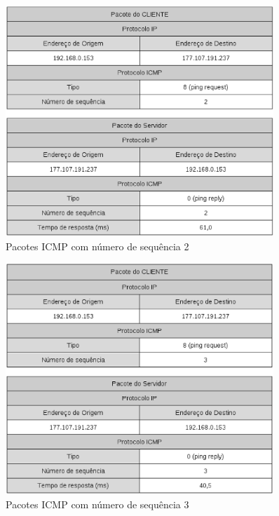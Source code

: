    \begin{figure}[h]
      \centering
      \includegraphics[width=0.9\textwidth]{figuras/pkg_icmp_seq_2.eps}
      \caption{Pacotes ICMP com número de sequência 2}
      \label{fig:pkg_icmp_seq_2}
    \end{figure}

    \begin{figure}[h]
      \centering
      \includegraphics[width=0.9\textwidth]{figuras/pkg_icmp_seq_3.eps}
      \caption{Pacotes ICMP com número de sequência 3}
      \label{fig:pkg_icmp_seq_3}
    \end{figure}

